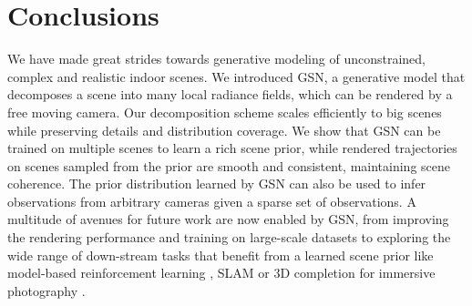 \documentclass[10pt,twocolumn,letterpaper]{article}
\begin{document}
\begin{table}[!t]
\centering
\small
{}
\vspace{0.3 cm}
\small
{}
\caption{Results of view synthesis on Vizdoom \cite{vizdoom} (a) and AVD \cite{avd} (b). GSN improves view synthesis quality as a result of modeling a powerful prior over scenes.}
\label{tab:inversion_quant}
\end{table}

\section{Conclusions}

We have made great strides towards generative modeling of unconstrained, complex and realistic indoor scenes. We introduced GSN, a generative model that decomposes a scene into many local radiance fields, which can be rendered by a free moving camera. Our decomposition scheme scales efficiently to big scenes while preserving details and distribution coverage. We show that GSN can be trained on multiple scenes to learn a rich scene prior, while rendered trajectories on scenes sampled from the prior are smooth and consistent, maintaining scene coherence. The prior distribution learned by GSN can also be used to infer observations from arbitrary cameras given a sparse set of observations. A multitude of avenues for future work are now enabled by GSN, from improving the rendering performance and training on large-scale datasets to exploring the wide range of down-stream tasks that benefit from a learned scene prior like model-based reinforcement learning \cite{gamegan}, SLAM \cite{neuralslam1} or 3D completion for immersive photography \cite{nerfies}.
\end{document}
